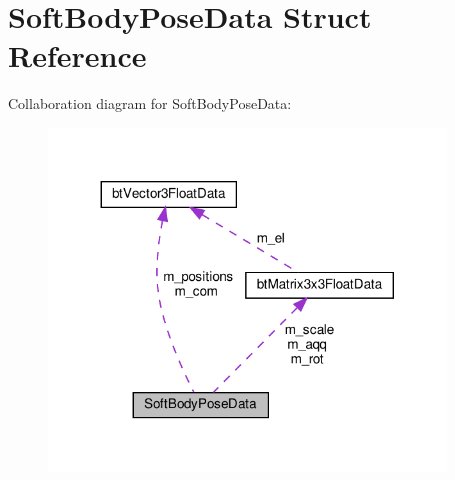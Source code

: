 \hypertarget{structSoftBodyPoseData}{}\section{Soft\+Body\+Pose\+Data Struct Reference}
\label{structSoftBodyPoseData}


Collaboration diagram for Soft\+Body\+Pose\+Data\+:
\nopagebreak
\begin{figure}[H]
\begin{center}
\leavevmode
\includegraphics[width=299pt]{structSoftBodyPoseData__coll__graph}
\end{center}
\end{figure}
